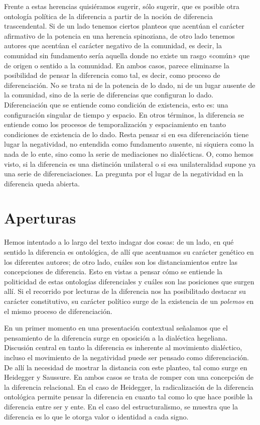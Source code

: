 Frente a estas herencias quisiéramos sugerir, sólo sugerir, que es posible otra ontología política de la diferencia a partir de la noción de diferencia trascendental. Si de un lado tenemos ciertos planteos que acentúan el carácter afirmativo de la potencia en una herencia spinoziana, de otro lado tenemos autores que acentúan el carácter negativo de la comunidad, es decir, la comunidad sin fundamento sería aquella donde no existe un rasgo «común» que de origen o sentido a la comunidad. En ambos casos, parece eliminarse la posibilidad de pensar la diferencia como tal, es decir, como proceso de diferenciación. No se trata ni de la potencia de lo dado, ni de un lugar ausente de la comunidad, sino de la serie de diferencias que configuran lo dado. Diferenciación que se entiende como condición de existencia, esto es: una configuración singular de tiempo y espacio. En otros términos, la diferencia se entiende como los procesos de temporalización y espaciamiento en tanto condiciones de existencia de lo dado. Resta pensar si en esa diferenciación tiene lugar la negatividad, no entendida como fundamento ausente, ni siquiera como la nada de lo ente, sino como la serie de mediaciones no dialécticas. O, como hemos visto, si la diferencia es una distinción unilateral o si esa unilateralidad supone ya una serie de diferenciaciones. La pregunta por el lugar de la negatividad en la diferencia queda abierta.

\section{Aperturas}


Hemos intentado a lo largo del texto indagar dos cosas: de un lado, en qué sentido la diferencia es ontológica, de allí que acentuamos su carácter genético en los diferentes autores; de otro lado, cuáles son los distanciamientos entre las concepciones de diferencia. Esto en vistas a pensar cómo se entiende la politicidad de estas ontologías diferenciales y cuáles son las posiciones que surgen allí. Si el recorrido por lecturas de la diferencia nos ha posibilitado destacar su carácter constitutivo, su carácter político surge de la existencia de un \emph{polemos} en el mismo proceso de diferenciación.

En un primer momento en una presentación contextual señalamos que el pensamiento de la diferencia surge en oposición a la dialéctica hegeliana. Discusión central en tanto la diferencia es inherente al movimiento dialéctico, incluso el movimiento de la negatividad puede ser pensado como diferenciación. De allí la necesidad de mostrar la distancia con este planteo, tal como surge en Heidegger y Saussure. En ambos casos se trata de romper con una concepción de la diferencia relacional. En el caso de Heidegger, la radicalización de la diferencia ontológica permite pensar la diferencia en cuanto tal como lo que hace posible la diferencia entre ser y ente. En el caso del estructuralismo, se muestra que la diferencia es lo que le otorga valor o identidad a cada signo.

